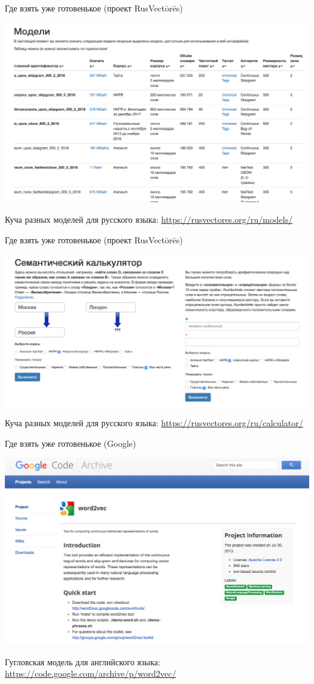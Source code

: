 \documentclass[notes,12pt, aspectratio=169]{beamer}
\begin{document}
\begin{frame}{Где взять уже готовенькое (проект RusVectōrēs)}
\begin{center}
\includegraphics[width=.7\linewidth]{rusvec_models.png}
\end{center}

\vfill

\footnotesize Куча разных моделей для русского языка:  {\color{blue} \url{https://rusvectores.org/ru/models/}}
\end{frame} 


\begin{frame}{Где взять уже готовенькое (проект RusVectōrēs)}
\begin{center}
\includegraphics[width=.65\linewidth]{rusvec_calc.png}
\end{center}

\vfill

\footnotesize Куча разных моделей для русского языка:  {\color{blue} \url{https://rusvectores.org/ru/calculator/}}
\end{frame} 


\begin{frame}{Где взять уже готовенькое (Google)}
\begin{center}
\includegraphics[width=.65\linewidth]{google_wv.png}
\end{center}

\vfill

\footnotesize Гугловская модель для английского языка:  {\color{blue} \url{https://code.google.com/archive/p/word2vec/}}
\end{frame} 
\end{document}
